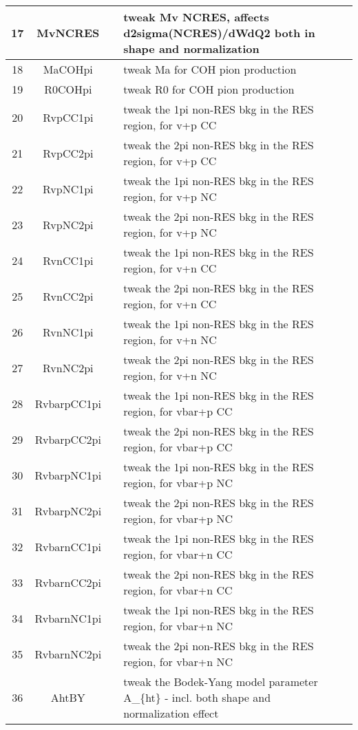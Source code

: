 \begin{longtable}{|c|c|c|X|c|}
\hline
17 & MvNCRES && tweak Mv NCRES, affects d2sigma(NCRES)/dWdQ2 both in shape and normalization & \\
\hline \hline
18 & MaCOHpi && tweak Ma for COH pion production & \\
\hline
19 & R0COHpi && tweak R0 for COH pion production & \\
\hline
20 & RvpCC1pi && tweak the 1pi non-RES bkg in the RES region, for v+p CC & \\
\hline
21 & RvpCC2pi && tweak the 2pi non-RES bkg in the RES region, for v+p CC & \\
\hline
22 & RvpNC1pi && tweak the 1pi non-RES bkg in the RES region, for v+p NC & \\
\hline
23 & RvpNC2pi && tweak the 2pi non-RES bkg in the RES region, for v+p NC & \\
\hline
24 & RvnCC1pi && tweak the 1pi non-RES bkg in the RES region, for v+n CC & \\
\hline
25 & RvnCC2pi && tweak the 2pi non-RES bkg in the RES region, for v+n CC & \\
\hline
26 & RvnNC1pi && tweak the 1pi non-RES bkg in the RES region, for v+n NC & \\
\hline
27 & RvnNC2pi && tweak the 2pi non-RES bkg in the RES region, for v+n NC & \\
\hline
28 & RvbarpCC1pi && tweak the 1pi non-RES bkg in the RES region, for vbar+p CC & \\
\hline
29 & RvbarpCC2pi && tweak the 2pi non-RES bkg in the RES region, for vbar+p CC & \\
\hline
30 & RvbarpNC1pi && tweak the 1pi non-RES bkg in the RES region, for vbar+p NC & \\
\hline
31 & RvbarpNC2pi && tweak the 2pi non-RES bkg in the RES region, for vbar+p NC & \\
\hline
32 & RvbarnCC1pi && tweak the 1pi non-RES bkg in the RES region, for vbar+n CC & \\
\hline
33 & RvbarnCC2pi && tweak the 2pi non-RES bkg in the RES region, for vbar+n CC & \\
\hline
34 & RvbarnNC1pi && tweak the 1pi non-RES bkg in the RES region, for vbar+n NC & \\
\hline
35 & RvbarnNC2pi && tweak the 2pi non-RES bkg in the RES region, for vbar+n NC & \\
\hline \hline
36 & AhtBY && tweak the Bodek-Yang model parameter A_\{ht\} - incl. both shape and normalization effect & \\

\end{longtable}
